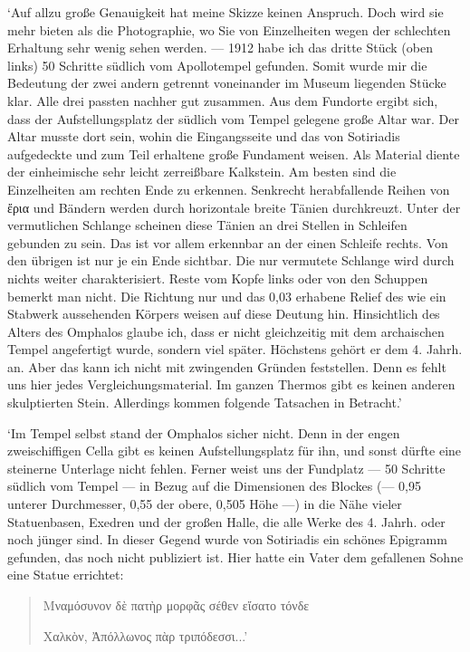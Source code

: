 \documentclass[a4paper, 11pt, oneside]{article}
\begin{document}
`Auf allzu große Genauigkeit hat meine Skizze keinen Anspruch. Doch wird sie mehr bieten als die Photographie, wo Sie von Einzelheiten wegen der schlechten Erhaltung sehr wenig sehen werden. --- 1912 habe ich das dritte Stück (oben links) 50 Schritte südlich vom Apollotempel gefunden. Somit wurde mir die Bedeutung der zwei andern getrennt voneinander im Museum liegenden Stücke klar. Alle drei passten nachher gut zusammen. Aus dem Fundorte ergibt sich, dass der Aufstellungsplatz der südlich vom Tempel gelegene große Altar war. Der Altar musste dort sein, wohin die Eingangsseite und das von Sotiriadis aufgedeckte und zum Teil erhaltene große Fundament weisen. Als Material diente der einheimische sehr leicht zerreißbare Kalkstein. Am besten sind die Einzelheiten am rechten Ende zu erkennen. Senkrecht herabfallende Reihen von ἔρια und Bändern werden durch horizontale breite Tänien durchkreuzt. Unter der vermutlichen Schlange scheinen diese Tänien an drei Stellen in Schleifen gebunden zu sein. Das ist vor allem erkennbar an der einen Schleife rechts. Von den übrigen ist nur je ein Ende sichtbar. Die nur vermutete Schlange wird durch nichts weiter charakterisiert. Reste vom Kopfe links oder von den Schuppen bemerkt man nicht. Die Richtung nur und das 0,03 erhabene Relief des wie ein Stabwerk aussehenden Körpers weisen auf diese Deutung hin. Hinsichtlich des Alters des Omphalos glaube ich, dass er nicht gleichzeitig mit dem archaischen Tempel angefertigt wurde, sondern viel später. Höchstens gehört er dem 4. Jahrh. an. Aber das kann ich nicht mit zwingenden Gründen feststellen. Denn es fehlt uns hier jedes Vergleichungsmaterial. Im ganzen Thermos gibt es keinen anderen skulptierten Stein. Allerdings kommen folgende Tatsachen in Betracht.'

`Im Tempel selbst stand der Omphalos sicher nicht. Denn in der engen zweischiffigen Cella gibt es keinen Aufstellungsplatz für ihn, und sonst dürfte eine steinerne Unterlage nicht fehlen. Ferner weist uns der Fundplatz --- 50 Schritte südlich vom Tempel --- in Bezug auf die Dimensionen des Blockes (--- 0,95 unterer Durchmesser, 0,55 der obere, 0,505 Höhe ---) in die Nähe vieler Statuenbasen, Exedren und der großen Halle, die alle Werke des 4. Jahrh. oder noch jünger sind. In dieser Gegend wurde von Sotiriadis ein schönes Epigramm gefunden, das noch nicht publiziert ist. Hier hatte ein Vater dem gefallenen Sohne eine Statue errichtet:
\begin{quotation}
\large
Μναμόσυνον δὲ πατὴρ μορφᾶς σέθεν εἴσατο τόνδε

\hspace*{5mm}Χαλκὸν, Ἀπόλλωνος πὰρ τριπόδεσσι...'
\end{quotation}
\end{document}
